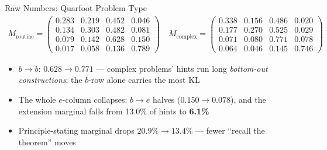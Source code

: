 \documentclass[10pt,aspectratio=169]{beamer}
\begin{document}
\begin{frame}{Raw Numbers: Quarfoot Problem Type}
  \begin{align*}
    M_{\text{routine}}=\begin{pmatrix}
      0.283 & 0.219 & 0.452 & 0.046\\
      0.134 & 0.303 & 0.482 & 0.081\\
      0.079 & 0.142 & \mathbf{0.628} & \mathbf{0.150}\\
      0.017 & 0.058 & 0.136 & 0.789
    \end{pmatrix}
    \quad
    M_{\text{complex}}=\begin{pmatrix}
      0.338 & 0.156 & 0.486 & 0.020\\
      0.177 & 0.270 & 0.525 & 0.029\\
      0.071 & 0.080 & \mathbf{0.771} & \mathbf{0.078}\\
      0.064 & 0.046 & 0.145 & 0.746
    \end{pmatrix}
  \end{align*}
  \begin{itemize}
    \item $b\to b$: $0.628 \to \mathbf{0.771}$ --- complex problems' hints run long
          \emph{bottom-out constructions}; the $b$-row alone carries the most KL
    \item The whole $e$-column collapses: $b\to e$ halves ($0.150 \to 0.078$), and
          the extension marginal falls from 13.0\% of hints to \textbf{6.1\%}
    \item Principle-stating marginal drops $20.9\% \to 13.4\%$ --- fewer ``recall the theorem'' moves
  \end{itemize}

\end{frame}
\end{document}
